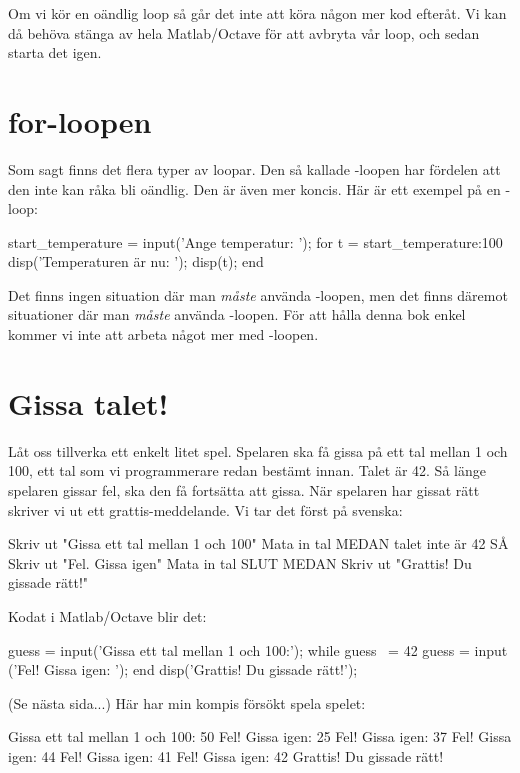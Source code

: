 Om vi kör en oändlig loop så går det inte att köra någon mer kod efteråt. Vi kan då behöva stänga av hela Matlab/Octave för att avbryta vår loop, och sedan starta det igen.
\newpage
\section{for-loopen}
Som sagt finns det flera typer av loopar. Den så kallade -loopen har fördelen att den inte kan råka bli oändlig. Den är även mer koncis. Här är ett exempel på en -loop:
\vspace{10pt}
\begin{matlab}
start_temperature = input('Ange temperatur: ');
for t = start_temperature:100
	disp('Temperaturen är nu: ');
	disp(t);
end
\end{matlab}

Det finns ingen situation där man \emph{måste} använda -loopen, men det finns däremot situationer där man \emph{måste} använda -loopen. För att hålla denna bok enkel kommer vi inte att arbeta något mer med -loopen.

\section{Gissa talet!}\label{subsec:gissa_talet1}
Låt oss tillverka ett enkelt litet spel. Spelaren ska få gissa på ett tal mellan 1 och 100, ett tal som vi programmerare redan bestämt innan. Talet är 42. Så länge spelaren gissar fel, ska den få fortsätta att gissa. När spelaren har gissat rätt skriver vi ut ett grattis-meddelande. Vi tar det först på svenska:

\begin{pseudo}
Skriv ut "Gissa ett tal mellan 1 och 100"
Mata in tal
MEDAN talet inte är 42 SÅ
   Skriv ut "Fel. Gissa igen"
   Mata in tal
SLUT MEDAN
Skriv ut "Grattis! Du gissade rätt!"
\end{pseudo}

Kodat i Matlab/Octave blir det:

\begin{matlab}[caption={Gissa talet},label={}]
guess = input('Gissa ett tal mellan 1 och 100:');
while guess ~= 42
    guess = input ('Fel! Gissa igen: ');
end
disp('Grattis! Du gissade rätt!');
\end{matlab}

(Se nästa sida...)
\newpage
Här har min kompis försökt spela spelet:

\vspace{10pt}
\begin{matlab}
Gissa ett tal mellan 1 och 100: 50
Fel! Gissa igen: 25
Fel! Gissa igen: 37
Fel! Gissa igen: 44
Fel! Gissa igen: 41
Fel! Gissa igen: 42
Grattis! Du gissade rätt!
\end{matlab}

